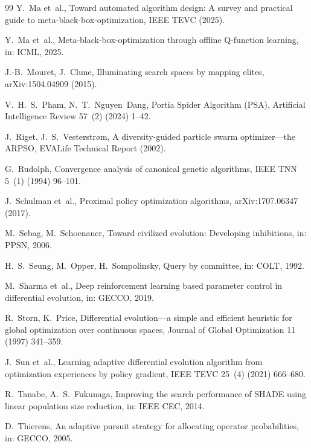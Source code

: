\documentclass[preprint,12pt,authoryear]{elsarticle}
\begin{document}
\begin{thebibliography}{99}
Y.~Ma et~al., Toward automated algorithm design: A survey and practical guide to meta-black-box-optimization, IEEE TEVC (2025).

Y.~Ma et~al., Meta-black-box-optimization through offline Q-function learning, in: ICML, 2025.

J.-B.~Mouret, J.~Clune, Illuminating search spaces by mapping elites, arXiv:1504.04909 (2015).

V.~H.~S.~Pham, N.~T.~Nguyen~Dang, Portia Spider Algorithm (PSA), Artificial Intelligence Review 57~(2) (2024) 1--42.

J.~Riget, J.~S.~Vesterstr{\o}m, A diversity-guided particle swarm optimizer---the ARPSO, EVALife Technical Report (2002).

G.~Rudolph, Convergence analysis of canonical genetic algorithms, IEEE TNN 5~(1) (1994) 96--101.

J.~Schulman et~al., Proximal policy optimization algorithms, arXiv:1707.06347 (2017).

M.~Sebag, M.~Schoenauer, Toward civilized evolution: Developing inhibitions, in: PPSN, 2006.

H.~S.~Seung, M.~Opper, H.~Sompolinsky, Query by committee, in: COLT, 1992.

M.~Sharma et~al., Deep reinforcement learning based parameter control in differential evolution, in: GECCO, 2019.

R.~Storn, K.~Price, Differential evolution---a simple and efficient heuristic for global optimization over continuous spaces, Journal of Global Optimization 11 (1997) 341--359.

J.~Sun et~al., Learning adaptive differential evolution algorithm from optimization experiences by policy gradient, IEEE TEVC 25~(4) (2021) 666--680.

R.~Tanabe, A.~S.~Fukunaga, Improving the search performance of SHADE using linear population size reduction, in: IEEE CEC, 2014.

D.~Thierens, An adaptive pursuit strategy for allocating operator probabilities, in: GECCO, 2005.


\end{thebibliography}
\end{document}
